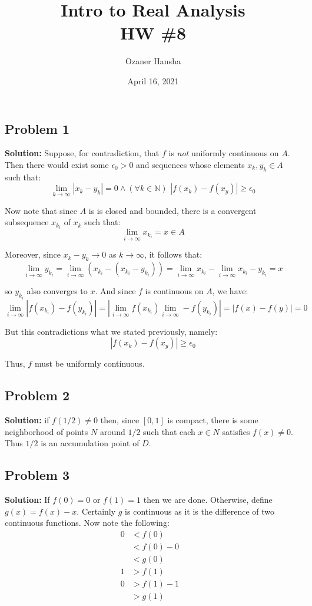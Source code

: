 \documentclass{article}
\newcommand{\N}{\mathbb N}
\begin{document}
\title{Intro to Real Analysis\\HW \#8}
\author{Ozaner Hansha}
\date{April 16, 2021}
\maketitle

\subsection*{Problem 1}
\noindent\textbf{Solution:} Suppose, for contradiction, that $f$ is \textit{not} uniformly continuous on $A$. Then there would exist some $\epsilon_0>0$ and sequences whose elements $x_k,y_k\in A$ such that:
$$\lim_{k\to\infty}|x_k-y_k|=0\wedge (\forall k\in\N)\,\,|f(x_k)-f(x_y)|\ge\epsilon_0$$

Now note that since $A$ is is closed and bounded, there is a convergent subsequence $x_{k_i}$ of $x_k$ such that:
$$\lim_{i\to\infty} x_{k_i}=x\in A$$

Moreover, since $x_k-y_k\to0$ as $k\to\infty$, it follows that:
$$\lim_{i\to\infty}y_{k_i}=\lim_{i\to\infty}(x_{k_i}-(x_{k_i}-y_{k_i}))=\lim_{i\to\infty}x_{k_i}-\lim_{i\to\infty}x_{k_i}-y_{k_i}=x$$

so $y_{k_i}$ also converges to $x$. And since $f$ is continuous on $A$, we have:
$$\lim_{i\to\infty}|f(x_{k_i})-f(y_{k_i})|=|\lim_{i\to\infty}f(x_{k_i})\lim_{i\to\infty}-f(y_{k_i})|=|f(x)-f(y)|=0$$

But this contradictions what we stated previously, namely:
$$|f(x_k)-f(x_y)|\ge\epsilon_0$$

Thus, $f$ must be uniformly continuous.

\subsection*{Problem 2}
\noindent\textbf{Solution:} if $f(1/2)\not=0$ then, since $[0,1]$ is compact, there is some neighborhood of points $N$ around $1/2$ such that each $x\in N$ satisfies $f(x)\not=0$. Thus $1/2$ is an accumulation point of $D$.

\subsection*{Problem 3}
\noindent\textbf{Solution:} If $f(0)=0$ or $f(1)=1$ then we are done. Otherwise, define $g(x)=f(x)-x$. Certainly $g$ is continuous as it is the difference of two continuous functions. Now note the following:
\begin{align*}
  0&<f(0)&\tag{$f(0)=0$ case already considered}\\
  &<f(0)-0\\
  &<g(0)\tag{def. of $g$}\\
  1&>f(1)\tag{$f(1)=1$ case already considered}\\
  0&>f(1)-1\\
  &>g(1)\tag{def. of $g$}
\end{align*}
\end{document}

